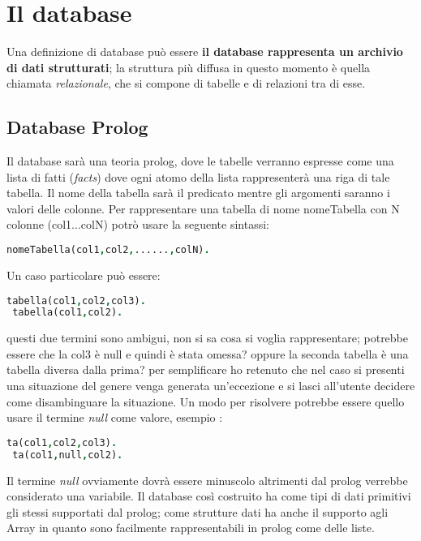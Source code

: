 \section{Il database}

Una definizione di database può essere {\bf il database rappresenta un archivio di dati strutturati}; la struttura più diffusa in questo momento è quella chiamata \emph{relazionale}, che si compone di tabelle e di relazioni tra di esse.

\subsection{Database Prolog}
Il database sarà una teoria prolog, dove le tabelle verranno espresse come una lista di fatti (\emph{facts}) dove ogni atomo della lista rappresenterà una riga di tale tabella. Il nome della tabella sarà il predicato mentre gli argomenti saranno i valori delle colonne. Per rappresentare una tabella di nome nomeTabella con N colonne (col1...colN) potrò usare la seguente sintassi:
\begin{lstlisting}[language=Prolog]
 nomeTabella(col1,col2,......,colN).
\end{lstlisting}
Un caso particolare può essere: 
\begin{lstlisting}[language=Prolog]
 tabella(col1,col2,col3).
 tabella(col1,col2).
\end{lstlisting}
questi due termini sono ambigui, non si sa cosa si voglia rappresentare; potrebbe essere che la col3 è null e quindi è stata omessa? oppure la seconda tabella è una tabella diversa dalla prima? per semplificare ho retenuto che nel caso si presenti una situazione del genere venga generata un'eccezione e si lasci all'utente decidere come disambinguare la situazione. Un modo per risolvere potrebbe essere quello usare il termine \emph{null} come valore, esempio : 

\begin{lstlisting}[language=Prolog]
 ta(col1,col2,col3).
 ta(col1,null,col2).
\end{lstlisting} 

Il termine \emph{null} ovviamente dovrà essere minuscolo altrimenti dal prolog verrebbe considerato una variabile. Il database così costruito ha come tipi di dati primitivi gli stessi supportati dal prolog; come strutture dati ha anche il supporto agli Array in quanto sono facilmente rappresentabili in prolog come delle liste. 

